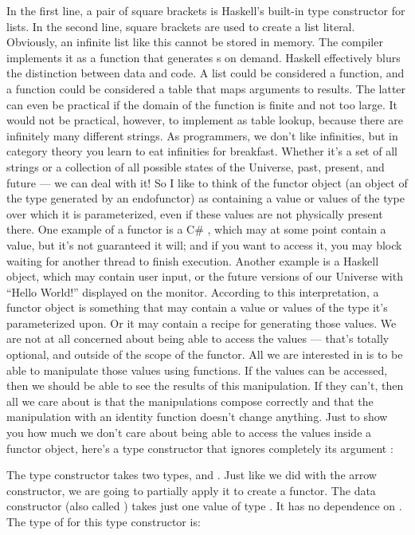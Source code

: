 In the first line, a pair of square brackets is Haskell's built-in
type constructor for lists. In the second line, square brackets are used
to create a list literal. Obviously, an infinite list like this cannot
be stored in memory. The compiler implements it as a function that
generates s on demand. Haskell effectively blurs the
distinction between data and code. A list could be considered a
function, and a function could be considered a table that maps arguments
to results. The latter can even be practical if the domain of the
function is finite and not too large. It would not be practical,
however, to implement  as table lookup, because there are
infinitely many different strings. As programmers, we don't like
infinities, but in category theory you learn to eat infinities for
breakfast. Whether it's a set of all strings or a collection of all
possible states of the Universe, past, present, and future --- we can
deal with it! So I like to think of the functor object (an object of the
type generated by an endofunctor) as containing a value or values of the
type over which it is parameterized, even if these values are not
physically present there. One example of a functor is a C\#
, which may at some point contain a value, but it's
not guaranteed it will; and if you want to access it, you may block
waiting for another thread to finish execution. Another example is a
Haskell  object, which may contain user input, or the future
versions of our Universe with ``Hello World!'' displayed on the monitor.
According to this interpretation, a functor object is something that may
contain a value or values of the type it's parameterized upon. Or it may
contain a recipe for generating those values. We are not at all
concerned about being able to access the values --- that's totally
optional, and outside of the scope of the functor. All we are interested
in is to be able to manipulate those values using functions. If the
values can be accessed, then we should be able to see the results of
this manipulation. If they can't, then all we care about is that the
manipulations compose correctly and that the manipulation with an
identity function doesn't change anything. Just to show you how much we
don't care about being able to access the values inside a functor
object, here's a type constructor that ignores completely its argument
:

The  type constructor takes two types,  and
. Just like we did with the arrow constructor, we are going to
partially apply it to create a functor. The data constructor (also
called ) takes just one value of type . It has
no dependence on . The type of  for this type
constructor is:

